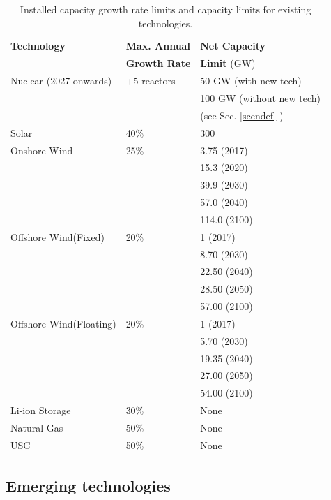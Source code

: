 \begin{table}[!ht]
	\caption{Installed capacity growth rate limits and capacity limits for existing technologies.}
	\vspace{0.1in}
	\begin{tabularx}{\textwidth}{p{} p{} p{} }
		\hline
\textbf{Technology} & \textbf{Max. Annual} & \textbf{Net Capacity} \\
  & \textbf{Growth Rate}  & \textbf{Limit} (GW) \\
\hline
Nuclear (2027 onwards) & +5 reactors & 50 GW (with new tech)  \\
 & & 100 GW (without new tech)  \\
  & & (see Sec. \ref{scendef} ) \\
Solar & 40\% & 300 \\
Onshore Wind & 25\% & 3.75 (2017) \\
 &  & 15.3 (2020) \\
 &  & 39.9 (2030) \\
 &  & 57.0 (2040) \\
 &  & 114.0 (2100) \\
Offshore Wind(Fixed) & 20\% & 1 (2017) \\
 &  & 8.70 (2030) \\
 &  & 22.50 (2040) \\
 &  & 28.50 (2050) \\
 &  & 57.00 (2100) \\
Offshore Wind(Floating) & 20\% & 1 (2017) \\
 &  & 5.70 (2030) \\
 &  & 19.35 (2040) \\
 &  & 27.00 (2050) \\
 &  & 54.00 (2100) \\
Li-ion Storage & 30\% & None  \\
Natural Gas &  50\% & None \\
\gls{USC} & 50\% & None \\
\hline 
\end{tabularx}
\label{existing-gro}
\end{table}


\subsection{Emerging technologies}

